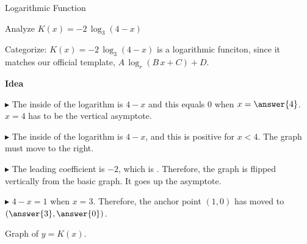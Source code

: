 \documentclass{ximera}
\begin{document}
\begin{example}  Logarithmic Function




Analyze   $K(x) = -2 \, \log_3(4-x)$ 


Categorize: $K(x) = -2 \, \log_3(4-x)$ is a logarithmic funciton, since it matches our official template, $A \, \log_r(B \, x + C) + D$. 




\textbf{\textcolor{blue!55!black}{Idea}} 

$\blacktriangleright$ The inside of the logarithm is $4-x$ and this equals $0$ when $x=\answer{4}$.  $x=4$ has to be the vertical asymptote.

$\blacktriangleright$ The inside of the logarithm is $4-x$, and this is positive for $x<4$.  The graph must move to the right.

$\blacktriangleright$ The leading coefficient is $-2$, which is  .  Therefore, the graph is flipped vertically from the basic graph. It goes up the asymptote. 

$\blacktriangleright$ $4-x=1$ when $x=3$. Therefore, the anchor point $(1,0)$ has moved to $\left( \answer{3}, \answer{0} \right)$.





Graph of $y = K(x)$.

\begin{image}
\end{image}
\end{example}
\end{document}
